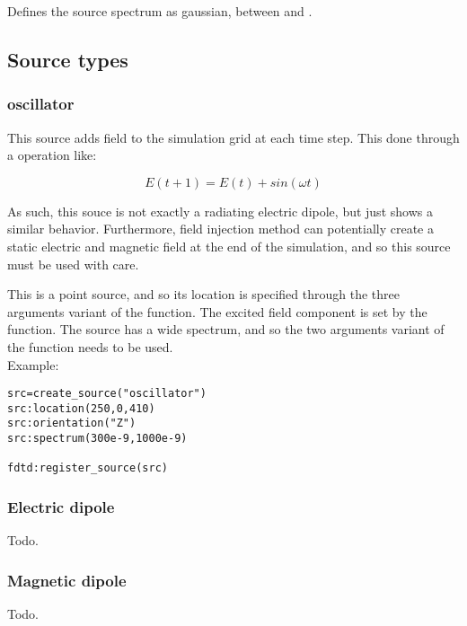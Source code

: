 Defines the source spectrum as gaussian, between  and .

\subsection{Source types}

\subsubsection{oscillator}

This source adds field to the simulation grid at each time step. This done through a operation like:

\begin{equation}
	E(t+1)=E(t)+sin(\omega t)
\end{equation}

As such, this souce is not exactly a radiating electric dipole, but just shows a similar behavior. Furthermore, field injection method can potentially create a static electric and magnetic field at the end of the simulation, and so this source must be used with care.
	
	This is a point source, and so its location is specified through the three arguments variant of the  function. The excited field component is set by the  function. The source has a wide spectrum, and so the two arguments variant of the  function needs to be used.\\ Example:

\begin{lstlisting}
src=create_source("oscillator")
src:location(250,0,410)
src:orientation("Z")
src:spectrum(300e-9,1000e-9)

fdtd:register_source(src)
\end{lstlisting}

\subsubsection{Electric dipole}

Todo.

\subsubsection{Magnetic dipole}

Todo.